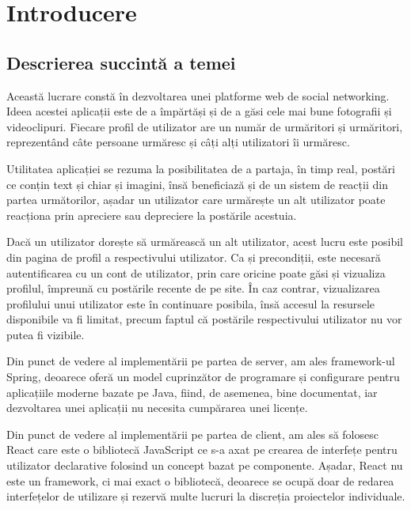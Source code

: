 \chapter{Introducere}
\section{Descrierea succintă a temei}

Această lucrare constă în dezvoltarea unei platforme web de social networking. Ideea acestei aplicații este de a împărtăși și de a găsi cele mai bune fotografii și videoclipuri. Fiecare profil de utilizator are un număr de urmăritori și urmăritori, reprezentând câte persoane urmăresc și câți alți utilizatori îi urmăresc.\newline

Utilitatea aplicației se rezuma la posibilitatea de a partaja, în timp real, postări ce conțin text și chiar și imagini, însă beneficiază și de un sistem de reacții din partea următorilor, așadar un utilizator care urmărește un alt utilizator poate reacționa prin apreciere sau depreciere la postările acestuia.\newline

Dacă un utilizator dorește să urmărească un alt utilizator, acest lucru este posibil din pagina de profil a respectivului utilizator. Ca și precondiții, este necesară autentificarea cu un cont de utilizator, prin care oricine poate găsi și vizualiza profilul, împreună cu postările recente de pe site. În caz contrar, vizualizarea profilului unui utilizator este în continuare posibila, însă accesul la resursele disponibile va fi limitat, precum faptul că postările respectivului utilizator nu vor putea fi vizibile.\newline

Din punct de vedere al implementării pe partea de server, am ales framework-ul Spring\cite{.springdoc}, deoarece oferă un model cuprinzător de programare și configurare pentru aplicațiile moderne bazate pe Java, fiind, de asemenea, bine documentat, iar dezvoltarea unei aplicații nu necesita cumpărarea unei licențe.\newline

Din punct de vedere al implementării pe partea de client, am ales să folosesc React\cite{.reactdoc} care este o bibliotecă JavaScript ce s-a axat pe crearea de interfețe pentru utilizator declarative folosind un concept bazat pe componente. Așadar, React nu este un framework, ci mai exact o bibliotecă, deoarece se ocupă doar de redarea interfețelor de utilizare și rezervă multe lucruri la discreția proiectelor individuale.


